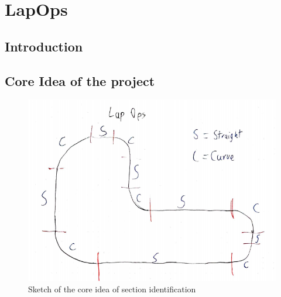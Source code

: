 \chapter{LapOps}


\section{Introduction}

\section{Core Idea of the project}
\begin{figure}[H]
	\centering
	\includegraphics[scale= 0.6]{Pictures/LapOpsSkizze.png}
	\caption{Sketch of the core idea of section identification}
	\label{sketchLapOps}
\end{figure}
